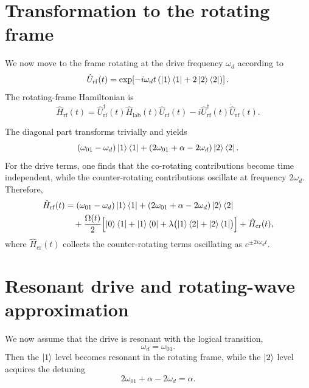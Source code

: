 \section{Transformation to the rotating frame}

We now move to the frame rotating at the drive frequency \(\omega_d\) according to
\begin{equation}
\hat U_{\mathrm{rf}}(t)
=
\exp\!\left[
-i\omega_d t\left(\ket{1}\bra{1}+2\ket{2}\bra{2}\right)
\right].
\label{eq:app_rotating_frame_unitary}
\end{equation}
The rotating-frame Hamiltonian is
\begin{equation}
\hat H_{\mathrm{rf}}(t)
=
\hat U_{\mathrm{rf}}^\dagger(t)\hat H_{\mathrm{lab}}(t)\hat U_{\mathrm{rf}}(t)
-
i\hat U_{\mathrm{rf}}^\dagger(t)\dot{\hat U}_{\mathrm{rf}}(t).
\label{eq:app_rotating_frame_hamiltonian_def}
\end{equation}

The diagonal part transforms trivially and yields
\begin{equation}
(\omega_{01}-\omega_d)\ket{1}\bra{1}
+
(2\omega_{01}+\alpha-2\omega_d)\ket{2}\bra{2}.
\label{eq:app_rotating_frame_diagonal_part}
\end{equation}
For the drive terms, one finds that the co-rotating contributions become time independent, while the counter-rotating contributions oscillate at frequency \(2\omega_d\). Therefore,
\begin{align}
\hat H_{\mathrm{rf}}(t)
&=
(\omega_{01}-\omega_d)\ket{1}\bra{1}
+
(2\omega_{01}+\alpha-2\omega_d)\ket{2}\bra{2}
\nonumber\\
&\quad+
\frac{\Omega(t)}{2}
\Bigl[
\ket{0}\bra{1}+\ket{1}\bra{0}
+
\lambda\bigl(\ket{1}\bra{2}+\ket{2}\bra{1}\bigr)
\Bigr]
+
\hat H_{\mathrm{cr}}(t),
\label{eq:app_rotating_frame_before_rwa}
\end{align}
where \(\hat H_{\mathrm{cr}}(t)\) collects the counter-rotating terms oscillating as \(e^{\pm 2i\omega_d t}\).

\section{Resonant drive and rotating-wave approximation}

We now assume that the drive is resonant with the logical transition,
\begin{equation}
\omega_d=\omega_{01}.
\label{eq:app_resonant_drive_condition}
\end{equation}
Then the \(\ket{1}\) level becomes resonant in the rotating frame, while the \(\ket{2}\) level acquires the detuning
\begin{equation}
2\omega_{01}+\alpha-2\omega_d=\alpha.
\label{eq:app_leakage_level_detuning}
\end{equation}

